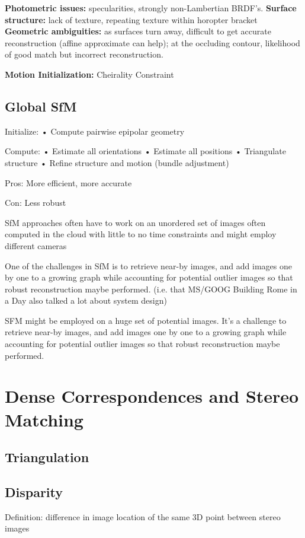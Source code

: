 \begin{enumerate}
\textbf{Photometric issues:} specularities, strongly non-Lambertian BRDF’s.
\textbf{Surface structure:} lack of texture, repeating texture within horopter bracket
\textbf{Geometric ambiguities:} as surfaces turn away, difficult to get accurate reconstruction
(affine approximate can help); at the occluding contour, likelihood of good match but incorrect
reconstruction. 

\textbf{Motion Initialization:} Cheirality Constraint

\subsection{Global SfM}

Initialize:
• Compute pairwise epipolar geometry

Compute:
• Estimate all orientations
• Estimate all positions
• Triangulate structure
• Refine structure and motion (bundle adjustment)

Pros: More efficient, more accurate 

Con: Less robust

SfM approaches often have to work on an unordered set of images often computed in the cloud with little to no time constraints and might employ different cameras

One of the challenges in SfM is to retrieve near-by images, and add images one by one to a growing graph while accounting for potential outlier images so that robust reconstruction maybe performed. (i.e. that MS/GOOG Building  Rome in a Day also talked a lot about system design)

SFM might be employed on a huge set of potential images. It's a challenge to retrieve near-by images, and add images one by one to a growing graph while accounting for potential outlier images so that robust reconstruction maybe performed. 

\section{Dense Correspondences and Stereo Matching}

\subsection{Triangulation}


\subsection{Disparity}
Definition: difference in image location of the same 3D point between stereo images


\end{enumerate}
